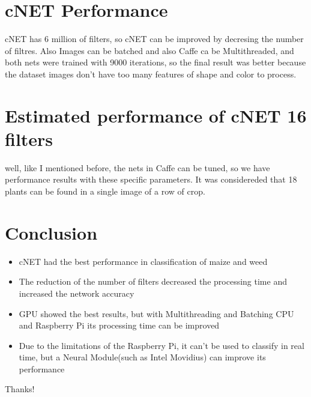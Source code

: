 \documentclass[10pt,a4paper]{proc}
\begin{document}
\section{cNET Performance}
cNET has 6 million of filters, so cNET can be improved by decresing the number of filtres. Also Images can be batched and also Caffe ca be Multithreaded, and both nets were trained with 9000 iterations, so the final result was better because the dataset images don't have too many features of shape and color to process. 
\section{Estimated performance of cNET 16 filters}
well, like I mentioned before, the nets in Caffe can be tuned, so we have performance results with these specific parameters. It was considereded that 18 plants can be found in a single image of a row of crop.
\section{Conclusion}
\begin{itemize}
\item cNET had the best performance in classification of maize and weed
\item The reduction of the number of filters decreased the processing time and increased the network accuracy 
\item GPU showed the best results, but with Multithreading and Batching CPU and Raspberry Pi its processing time can be improved 
\item Due to the limitations of the Raspberry Pi, it can't be used to classify in real time, but a Neural Module(such as Intel Movidius) can improve its performance \end{itemize}
Thanks!
\end{document}
